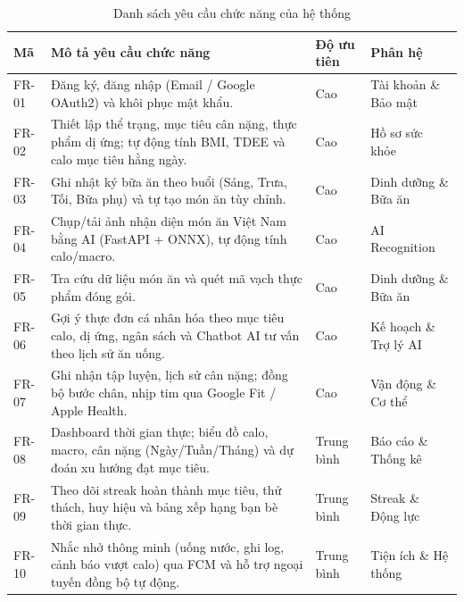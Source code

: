 \documentclass[../main.tex]{subfiles}
\begin{document}
\begin{table}[H]
    \centering
    \caption{Danh sách yêu cầu chức năng của hệ thống}
    \label{tab:ch3_fr}
    \begin{tabular}{|p{}|p{}|p{}|p{}|}
        \hline
        \rowcolor{primary!35}
        \textbf{Mã} & \textbf{Mô tả yêu cầu chức năng} & \textbf{Độ ưu tiên} & \textbf{Phân hệ} \\
        \hline
        FR-01 & Đăng ký, đăng nhập (Email / Google OAuth2) và khôi phục mật khẩu. & Cao & Tài khoản \& Bảo mật \\
        \hline
        FR-02 & Thiết lập thể trạng, mục tiêu cân nặng, thực phẩm dị ứng; tự động tính BMI, TDEE và calo mục tiêu hằng ngày. & Cao & Hồ sơ sức khỏe \\
        \hline
        FR-03 & Ghi nhật ký bữa ăn theo buổi (Sáng, Trưa, Tối, Bữa phụ) và tự tạo món ăn tùy chỉnh. & Cao & Dinh dưỡng \& Bữa ăn \\
        \hline
        FR-04 & Chụp/tải ảnh nhận diện món ăn Việt Nam bằng AI (FastAPI + ONNX), tự động tính calo/macro. & Cao & AI Recognition \\
        \hline
        FR-05 & Tra cứu dữ liệu món ăn và quét mã vạch thực phẩm đóng gói. & Cao & Dinh dưỡng \& Bữa ăn \\
        \hline
        FR-06 & Gợi ý thực đơn cá nhân hóa theo mục tiêu calo, dị ứng, ngân sách và Chatbot AI tư vấn theo lịch sử ăn uống. & Cao & Kế hoạch \& Trợ lý AI \\
        \hline
        FR-07 & Ghi nhận tập luyện, lịch sử cân nặng; đồng bộ bước chân, nhịp tim qua Google Fit / Apple Health. & Cao & Vận động \& Cơ thể \\
        \hline
        FR-08 & Dashboard thời gian thực; biểu đồ calo, macro, cân nặng (Ngày/Tuần/Tháng) và dự đoán xu hướng đạt mục tiêu. & Trung bình & Báo cáo \& Thống kê \\
        \hline
        FR-09 & Theo dõi streak hoàn thành mục tiêu, thử thách, huy hiệu và bảng xếp hạng bạn bè thời gian thực. & Trung bình & Streak \& Động lực \\
        \hline
        FR-10 & Nhắc nhở thông minh (uống nước, ghi log, cảnh báo vượt calo) qua FCM và hỗ trợ ngoại tuyến đồng bộ tự động. & Trung bình & Tiện ích \& Hệ thống \\
        \hline
    \end{tabular}
\end{table}
\end{document}
